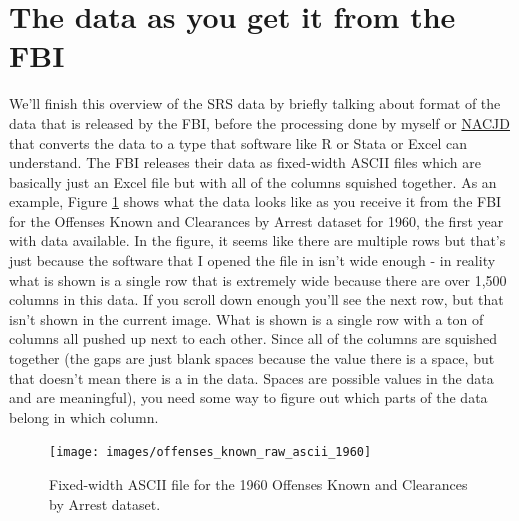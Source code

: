 \documentclass[
  12pt,
  openany]{book}
\begin{document}
\section{The data as you get it from the FBI}\label{the-data-as-you-get-it-from-the-fbi}

We'll finish this overview of the SRS data by briefly talking about format of the data that is released by the FBI, before the processing done by myself or \href{https://www.icpsr.umich.edu/web/pages/NACJD/index.html}{NACJD} that converts the data to a type that software like R or Stata or Excel can understand. The FBI releases their data as fixed-width ASCII files which are basically just an Excel file but with all of the columns squished together. As an example, Figure \ref{fig:SRSascii} shows what the data looks like as you receive it from the FBI for the Offenses Known and Clearances by Arrest dataset for 1960, the first year with data available. In the figure, it seems like there are multiple rows but that's just because the software that I opened the file in isn't wide enough - in reality what is shown is a single row that is extremely wide because there are over 1,500 columns in this data. If you scroll down enough you'll see the next row, but that isn't shown in the current image. What is shown is a single row with a ton of columns all pushed up next to each other. Since all of the columns are squished together (the gaps are just blank spaces because the value there is a space, but that doesn't mean there is a in the data. Spaces are possible values in the data and are meaningful), you need some way to figure out which parts of the data belong in which column.

\begin{figure}

{\centering \texttt{[image: images/offenses\_known\_raw\_ascii\_1960]} 

}

\caption{Fixed-width ASCII file for the 1960 Offenses Known and Clearances by Arrest dataset.}\label{fig:SRSascii}
\end{figure}
\end{document}
